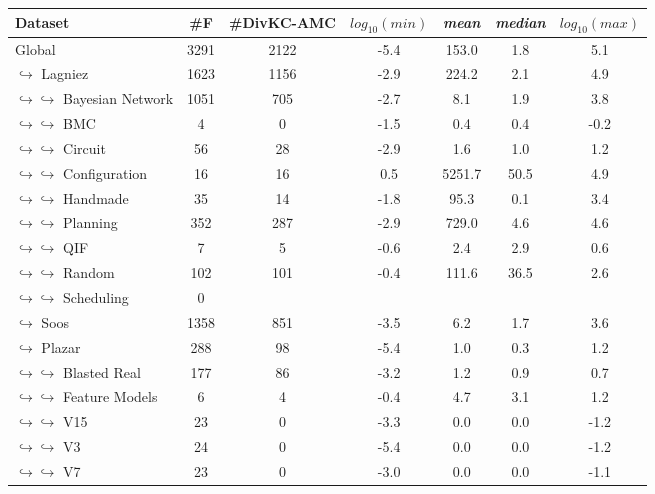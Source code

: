 \documentclass{article}
\newcommand\divkcamc[0]{DivKC-AMC\xspace}
\begin{document}
    
\begin{table}[h!]
        \centering
            \begin{tabular}{l|c|c|c|c|c|c}
                Dataset & \#F & \#\divkcamc & $\textit{log}_{10}(\textit{min})$ & \textit{mean} & \textit{median} & $\textit{log}_{10}(\textit{max})$ \\
                \hline 
Global & 3291 & 2122 &  -5.4 & 153.0 &   1.8 &   5.1 \\
$\hookrightarrow$ Lagniez \cite{D4} & 1623 & 1156 &  -2.9 & 224.2 &   2.1 &   4.9 \\
$\hookrightarrow \hookrightarrow$ Bayesian Network & 1051 & 705 &  -2.7 &   8.1 &   1.9 &   3.8 \\
$\hookrightarrow \hookrightarrow$ BMC & 4 & 0 &  -1.5 &   0.4 &   0.4 &  -0.2 \\
$\hookrightarrow \hookrightarrow$ Circuit & 56 & 28 &  -2.9 &   1.6 &   1.0 &   1.2 \\
$\hookrightarrow \hookrightarrow$ Configuration & 16 & 16 &   0.5 & 5251.7 &  50.5 &   4.9 \\
$\hookrightarrow \hookrightarrow$ Handmade & 35 & 14 &  -1.8 &  95.3 &   0.1 &   3.4 \\
$\hookrightarrow \hookrightarrow$ Planning & 352 & 287 &  -2.9 & 729.0 &   4.6 &   4.6 \\
$\hookrightarrow \hookrightarrow$ QIF & 7 & 5 &  -0.6 &   2.4 &   2.9 &   0.6 \\
$\hookrightarrow \hookrightarrow$ Random & 102 & 101 &  -0.4 & 111.6 &  36.5 &   2.6 \\
$\hookrightarrow \hookrightarrow$ Scheduling & 0 & & & \\
$\hookrightarrow$ Soos \cite{soos_2024_10449477} & 1358 & 851 &  -3.5 &   6.2 &   1.7 &   3.6 \\
$\hookrightarrow$ Plazar \cite{Plazar2019} & 288 & 98 &  -5.4 &   1.0 &   0.3 &   1.2 \\
$\hookrightarrow \hookrightarrow$ Blasted Real & 177 & 86 &  -3.2 &   1.2 &   0.9 &   0.7 \\
$\hookrightarrow \hookrightarrow$ Feature Models & 6 & 4 &  -0.4 &   4.7 &   3.1 &   1.2 \\
$\hookrightarrow \hookrightarrow$ V15 & 23 & 0 &  -3.3 &   0.0 &   0.0 &  -1.2 \\
$\hookrightarrow \hookrightarrow$ V3 & 24 & 0 &  -5.4 &   0.0 &   0.0 &  -1.2 \\
$\hookrightarrow \hookrightarrow$ V7 & 23 & 0 &  -3.0 &   0.0 &   0.0 &  -1.1 \\

\end{tabular}
\end{table}
\end{document}
